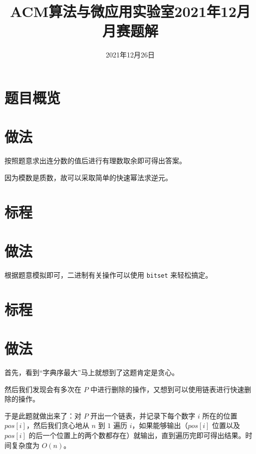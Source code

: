 \documentclass{ctsol}
\title{ACM算法与微应用实验室2021年12月月赛题解}
\date{2021年12月26日}
\begin{document}
\maketitle
{}

\section*{题目概览}
\solutiontab

\makesolution
\section*{做法}

按照题意求出连分数的值后进行有理数取余即可得出答案。

因为模数是质数，故可以采取简单的快速幂法求逆元。

\section*{标程}

\makesolution
\section*{做法}

根据题意模拟即可，二进制有关操作可以使用 \verb|bitset| 来轻松搞定。

\section*{标程}

\makesolution
\section*{做法}

首先，看到“字典序最大”马上就想到了这题肯定是贪心。

然后我们发现会有多次在 $P$ 中进行删除的操作，又想到可以使用链表进行快速删除的操作。

于是此题就做出来了：对 $P$ 开出一个链表，并记录下每个数字 $i$ 所在的位置 $pos[i]$，然后我们贪心地从 $n$ 到 $1$ 遍历 $i$，如果能够输出（$pos[i]$ 位置以及 $pos[i]$ 的后一个位置上的两个数都存在）就输出，直到遍历完即可得出结果。时间复杂度为 $O(n)$。
\end{document}
